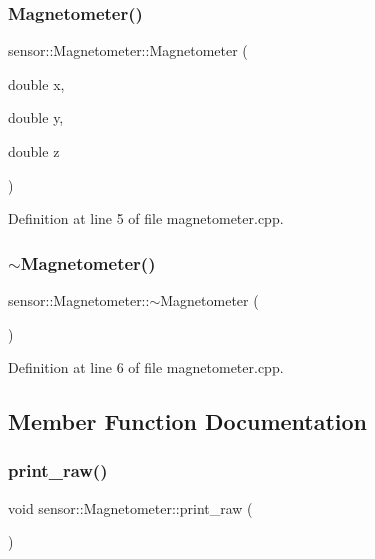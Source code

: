 \subsubsection{\texorpdfstring{Magnetometer()}{Magnetometer()}\hspace{0.1cm}{\footnotesize\ttfamily [2/2]}}
{\footnotesize\ttfamily sensor\+::\+Magnetometer\+::\+Magnetometer (\begin{DoxyParamCaption}\item[{double}]{x,  }\item[{double}]{y,  }\item[{double}]{z }\end{DoxyParamCaption})}



Definition at line 5 of file magnetometer.\+cpp.

\mbox{\label{classsensor_1_1_magnetometer_acaebbf476faf2f2e029e9d4e5d1ff896}} 
\subsubsection{\texorpdfstring{$\sim$\+Magnetometer()}{~Magnetometer()}}
{\footnotesize\ttfamily sensor\+::\+Magnetometer\+::$\sim$\+Magnetometer (\begin{DoxyParamCaption}{ }\end{DoxyParamCaption})}



Definition at line 6 of file magnetometer.\+cpp.



\subsection{Member Function Documentation}
\mbox{\label{classsensor_1_1_magnetometer_a808eda46aabd080426c909563da0f425}} 
\subsubsection{\texorpdfstring{print\+\_\+raw()}{print\_raw()}}
{\footnotesize\ttfamily void sensor\+::\+Magnetometer\+::print\+\_\+raw (\begin{DoxyParamCaption}{ }\end{DoxyParamCaption})\hspace{0.3cm}{\ttfamily [virtual]}}



